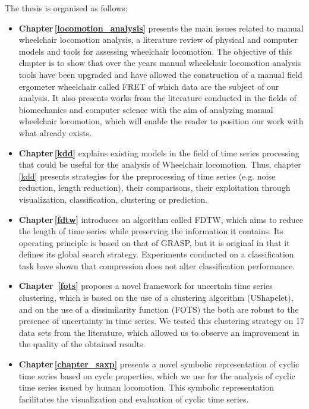 The thesis is organised as follows:
\begin{itemize}
\item \textbf{Chapter\,\ref{locomotion_analysis}} presents the main issues related to manual wheelchair locomotion analysis, a literature review of physical and computer models and tools for assessing wheelchair locomotion. The objective of this chapter is to show that over the years manual wheelchair locomotion analysis tools have been upgraded and have allowed the construction of a manual field ergometer wheelchair called FRET of which data are the subject of our analysis. It also presents works from the literature conducted in the fields of biomechanics and computer science with the aim of analyzing manual wheelchair locomotion, which will enable the reader to position our work with what already exists.


\item \textbf{Chapter\,\ref{kdd}} explains existing models in the field of time series processing that could be useful for the analysis of  Wheelchair locomotion. Thus, chapter \ref{kdd} presents strategies for the preprocessing of time series (e.g. noise reduction, length reduction), their comparisons, their exploitation through visualization, classification, clustering or prediction.
 
 
\item \textbf{Chapter\,\ref{fdtw}} introduces an algorithm called FDTW, which aims to reduce the length of time series while preserving the information it contains. Its operating principle is based on that of GRASP, but it is original in that it defines its global search strategy. Experiments conducted on a classification task have shown that compression does not alter classification performance. 

\item \textbf{Chapter\, \ref{fots}} proposes a novel framework for uncertain time series clustering, which is based on the use of a clustering algorithm (UShapelet), and on the use of a dissimilarity function (FOTS)  the both are robust to the presence of uncertainty in time series. We tested this clustering strategy on 17 data sets from the literature, which allowed us to observe an improvement in the quality of the obtained results.


\item \textbf{Chapter\,\ref{chapter_saxp}} presents a novel symbolic representation of cyclic time series based on cycle properties, which we use for the analysis of cyclic time series issued by human locomotion. This symbolic representation  facilitates the visualization and evaluation of cyclic time series.


\end{itemize}
